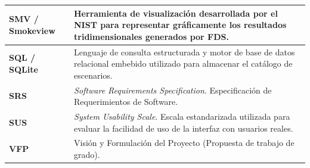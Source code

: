\begin{longtable}{|p{3.2cm}|p{11.5cm}|}
\textbf{SMV / Smokeview} & Herramienta de visualización desarrollada por el NIST para representar gráficamente los resultados tridimensionales generados por FDS. \\ \hline
\textbf{SQL / SQLite} & Lenguaje de consulta estructurada y motor de base de datos relacional embebido utilizado para almacenar el catálogo de escenarios. \\ \hline
\textbf{SRS} & \textit{Software Requirements Specification}. Especificación de Requerimientos de Software. \\ \hline
\textbf{SUS} & \textit{System Usability Scale}. Escala estandarizada utilizada para evaluar la facilidad de uso de la interfaz con usuarios reales. \\ \hline
\textbf{VFP} & Visión y Formulación del Proyecto (Propuesta de trabajo de grado). \\ \hline
\end{longtable}
